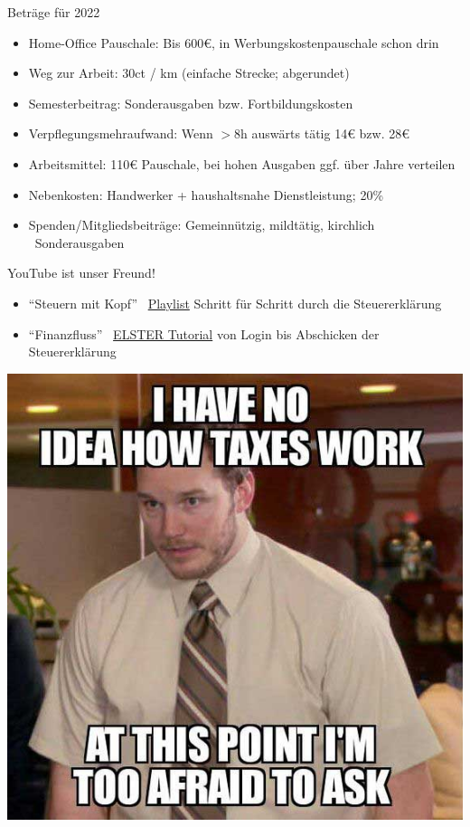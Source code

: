 \documentclass{beamer}
\newcommand{\n}{\hfill\\\vspace{0.25cm}}
\begin{document}
			\begin{frame}{}
				\begingroup\tiny Beträge für 2022\endgroup
				\begin{itemize}
					\item Home-Office Pauschale: Bis 600€, in Werbungskostenpauschale schon drin
					\item Weg zur Arbeit: 30ct / km (einfache Strecke; abgerundet)
					\item Semesterbeitrag: Sonderausgaben bzw. Fortbildungskosten
					\item Verpflegungsmehraufwand: Wenn $>$8h auswärts tätig 14€ bzw. 28€
					\item Arbeitsmittel: 110€ Pauschale, bei hohen Ausgaben ggf. über Jahre verteilen
					\item Nebenkosten: Handwerker + haushaltsnahe Dienstleistung; 20\%
					\item Spenden/Mitgliedsbeiträge: Gemeinnützig, mildtätig, kirchlich \textrightarrow\ Sonderausgaben
				\end{itemize}
			\end{frame}
		
			\begin{frame}
				YouTube ist unser Freund!\n
				\begin{itemize}
					\item "`Steuern mit Kopf"' \textrightarrow\ \href{https://www.youtube.com/watch?v=vEYL7AlCTgw&list=PL0OXhlRkvak8sq4efIvHYxx4e_DrE8zZT}{Playlist} Schritt für Schritt durch die Steuererklärung
					\item "`Finanzfluss"' \textrightarrow\ \href{https://www.youtube.com/watch?v=FiAGN-RrHMg}{ELSTER Tutorial} von Login bis Abschicken der Steuererklärung
				\end{itemize}
			\end{frame}
	
		{
		\setbeamertemplate{background canvas}{}
		\begin{frame}[plain]
			\begin{center}
				\includegraphics[height=\textheight]{images/too-afraid-to-ask}
			\end{center}
		\end{frame}
		}
\end{document}
